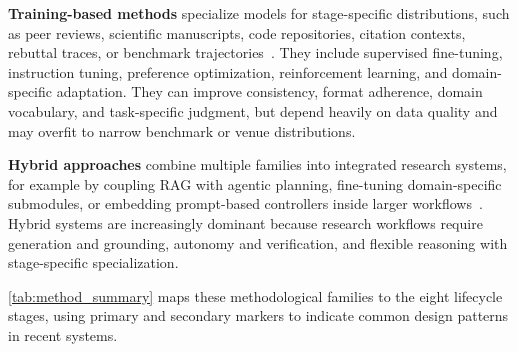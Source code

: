 \documentclass{llmxive}
\begin{document}
\textbf{Training-based methods} specialize models for stage-specific distributions, such as peer reviews, scientific manuscripts, code repositories, citation contexts, rebuttal traces, or benchmark trajectories~\cite{ouyang2022training,wang2023selfinstruct}. They include supervised fine-tuning, instruction tuning, preference optimization, reinforcement learning, and domain-specific adaptation. They can improve consistency, format adherence, domain vocabulary, and task-specific judgment, but depend heavily on data quality and may overfit to narrow benchmark or venue distributions.

\textbf{Hybrid approaches} combine multiple families into integrated research systems, for example by coupling RAG with agentic planning, fine-tuning domain-specific submodules, or embedding prompt-based controllers inside larger workflows~\cite{lu2024aiscientist,lala2023paperqa,shao2024storm,openscholar2025}. Hybrid systems are increasingly dominant because research workflows require generation and grounding, autonomy and verification, and flexible reasoning with stage-specific specialization.

\cref{tab:method_summary} maps these methodological families to the eight lifecycle stages, using primary and secondary markers to indicate common design patterns in recent systems. 
\end{document}
